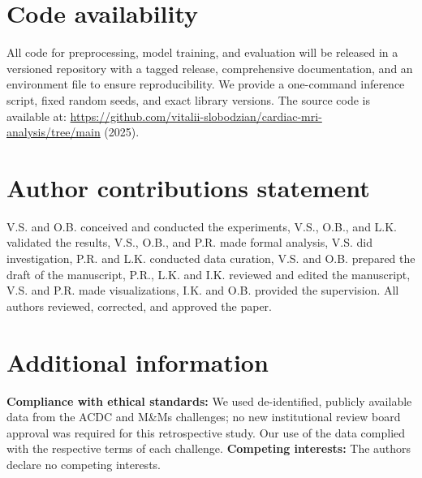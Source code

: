 \documentclass[fleqn,10pt]{wlscirep}
\begin{document}
\section*{Code availability}
All code for preprocessing, model training, and evaluation will be released in a versioned repository with a tagged release, comprehensive documentation, and an environment file to ensure reproducibility. We provide a one-command inference script, fixed random seeds, and exact library versions. The source code is available at: \url{https://github.com/vitalii-slobodzian/cardiac-mri-analysis/tree/main} (2025).



\section*{Author contributions statement}
V.S. and O.B. conceived and conducted the experiments, V.S., O.B., and L.K. validated the results, V.S., O.B., and P.R. made formal analysis, V.S. did investigation, P.R. and L.K. conducted data curation, V.S. and O.B. prepared the draft of the manuscript, P.R., L.K. and I.K. reviewed and edited the manuscript, V.S. and P.R. made visualizations, I.K. and O.B. provided the supervision. All authors reviewed, corrected, and approved the paper.

\section*{Additional information}

\textbf{Compliance with ethical standards:} We used de-identified, publicly available data from the ACDC and M\&Ms challenges; no new institutional review board approval was required for this retrospective study. Our use of the data complied with the respective terms of each challenge.
\textbf{Competing interests:} The authors declare no competing interests.
\end{document}
